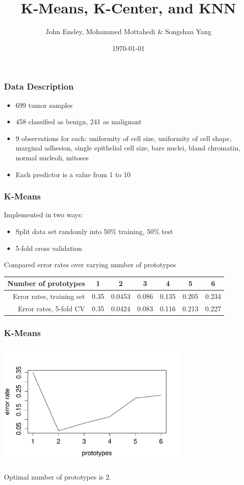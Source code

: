 \documentclass[10pt]{beamer}
\title{K-Means, K-Center, and KNN}
\date{\today}
\author{John Ensley, Mohammed Mottahedi \& Songshan Yang}
\institute{Penn State University \\ STAT 557}
\begin{document}
\maketitle

\begin{frame}\frametitle{Data Description}
\begin{itemize}
  \item 699 tumor samples
  \item 458 classified as benign, 241 as malignant
  \item 9 observations for each: uniformity of cell size, uniformity of cell shape, marginal adhesion, single epithelial cell size, bare nuclei, bland chromatin, normal nucleoli, mitoses
  \item Each predictor is a value from 1 to 10
\end{itemize}
\end{frame}

\begin{frame}\frametitle{K-Means}
    Implemented in two ways:
    \begin{itemize}
        \item Split data set randomly into 50\% training, 50\% test
        \item 5-fold cross validation
    \end{itemize}

    Compared error rates over varying number of prototypes

    \begin{center}
    \begin{tabular}{rcccccc}
        \toprule
        Number of prototypes & 1 & 2 & 3 & 4 & 5 & 6 \\
        \midrule
        Error rates, training set & 0.35 & 0.0453 & 0.086 & 0.135 & 0.205 & 0.234 \\
        Error rates, 5-fold CV & 0.35 & 0.0424 & 0.083 & 0.116 & 0.213 & 0.227 \\
        \bottomrule
    \end{tabular}
    \end{center}
\end{frame}

\begin{frame}\frametitle{K-Means}
    \begin{center}
        \includegraphics[width=0.7\textwidth]{1.pdf}
    \end{center}

    Optimal number of prototypes is 2.
\end{frame}
\end{document}
